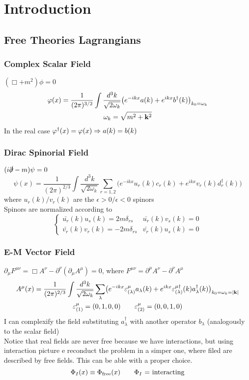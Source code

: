\chapter{Introduction}

\section{Free Theories Lagrangians}

\subsection{Complex Scalar Field}
$(\Box + m^2) \phi = 0$
\begin{gather}
\phi(x) = \frac{1}{(2 \pi)^{3/2}} \int \frac{d^3 k}{\sqrt{2 \omega_k}} \bigl( e^{-ikx} a(k) + e^{ikx} b^{\dagger}(k) \bigr)_{k_0 = \omega_k} \notag \\
\omega_k = \sqrt{m^2 + \vec{k}^2} \notag
\end{gather}
In the real case $\phi^{\dagger}(x) = \phi(x) \so a(k) = b(k)$

\subsection{Dirac Spinorial Field}
$(i \slashed{\partial} - m) \psi = 0$
\[
\psi(x) = \frac{1}{(2 \pi)^{2/3}} \int \frac{d^3 k}{\sqrt{2 \omega_k}} \sum_{r=1,2} \bigl( e^{-ikx} u_r (k) c_r(k) + e^{ikx} v_r(k) d^{\dagger}_r(k) \bigr) 
\]
where $u_r(k)/v_r(k)$ are the $\epsilon > 0/\epsilon <0$ spinors\\
Spinors are normalized according to
\[
\begin{cases}
\bar{u_r}(k) u_s(k) = 2m \delta_{rs}	& \bar{u_r}(k) v_s(k) = 0 \\
\bar{v_r}(k) v_r(k) = -2m \delta_{rs} 	& \bar{v_r}(k)u_s(k) = 0
\end{cases}
\]

\subsection{E-M Vector Field}
$\partial_{\mu} F^{\mu \nu} = \Box A^{\nu} - \partial^{\nu}(\partial_{\mu} A^{\mu}) = 0$, where $F^{\mu \nu} = \partial^{\mu} A^{\nu} - \partial^{\nu} A^{\mu}$
\begin{gather}
A^{\mu}(x) = \frac{1}{(2 \pi)^{2/3}} \int \frac{d^3 k}{\sqrt{2 \omega_k}} \sum_{\lambda} \bigl( e^{-ikx} \epsilon_{(\lambda)}^{\mu} a_{\lambda}(k) + e^{ikx} \epsilon_{(\lambda)}^{\mu \dagger}(k) a^{\dagger}_{\lambda}(k) \bigr)_{k_0 = \omega_k = \abs{\vec{k}}} \notag \\
\epsilon_{(1)}^{\mu} = (0, 1, 0, 0) \qquad \epsilon_{(2)}^{\mu} = (0, 0, 1, 0) \notag
\end{gather}
I can complexify the field substituting $a_{\lambda}^{\dagger}$ with another operator $b_{\lambda}$ (analogously to the scalar field)\\
Notice that real fields are never free because we have interactions, but using interaction picture e reconduct the problem in a simper one, where filed are described by free fields. This can be able with a proper choice.
\[
\Phi_I (x) \equiv \Phi_{\textup{free}}(x) \qquad \Phi_I \text{ = interacting}
\]

